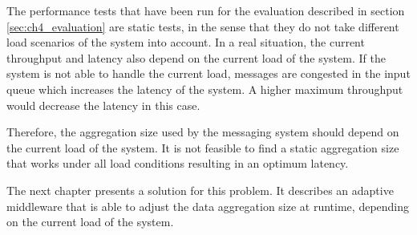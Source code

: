 The performance tests that have been run for the evaluation described in section \ref{sec:ch4_evaluation} are static tests, in the sense that they do not take different load scenarios of the system into account. In a real situation, the current throughput and latency also depend on the current load of the system. If the system is not able to handle the current load, messages are congested in the input queue which increases the latency of the system. A higher maximum throughput would decrease the latency in this case. 

Therefore, the aggregation size used by the messaging system should depend on the current load of the system. It is not feasible to find a static aggregation size that works under all load conditions resulting in an optimum latency.

The next chapter presents a solution for this problem. It describes an adaptive middleware that is able to adjust the data aggregation size at runtime, depending on the current load of the system.